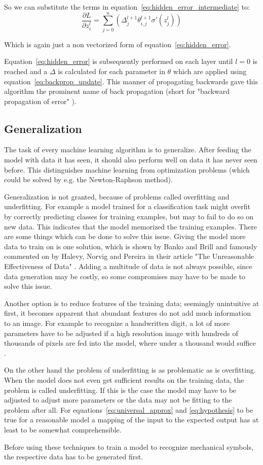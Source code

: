 So we can substitute the terms in equation~\eqref{eq:hidden_error_intermediate} to:
\begin{equation}
    \frac{\partial L}{\partial z^l_i} = \sum_{j=0}^n (\varDelta^{l+1}_j \theta^{l+1}_{i,j} \sigma'(z_j^l))
\end{equation}

Which is again just a non vectorized form of equation~\eqref{eq:hidden_error}.

Equation~\eqref{eq:hidden_error} is subsequently performed on each layer until $l=0$ is reached and a $\varDelta$ is calculated for each parameter in $\theta$ which are applied using equation~\eqref{eq:backprop_update}.
This manner of propagating backwards gave this algorithm the prominent name of back propagation (short for "backward propagation of error" \cite{Rumelhart1986}).

\subsection{Generalization}

The task of every machine learning algorithm is to generalize.
After feeding the model with data it has seen, it should also perform well on data it has never seen before.
This distinguishes machine learning from optimization problems (which could be solved by e.g. the Newton-Raphson method).

Generalization is not granted, because of problems called overfitting and underfitting.
For example a model trained for a classification task might overfit by correctly predicting classes for training examples, but may to fail to do so on new data.
This indicates that the model memorized the training examples.
There are some things which can be done to solve this issue.
Giving the model more data to train on is one solution, which is shown by Banko and Brill \cite{Banko2001} and famously commented on by Halevy, Norvig and Pereira in their article "The Unreasonable Effectiveness of Data" \cite{Halevy2009}.
Adding a multitude of data is not always possible, since data generation may be costly, so some compromises may have to be made to solve this issue.

Another option is to reduce features of the training data; seemingly unintuitive at first, it becomes apparent that abundant features do not add much information to an image. For example to recognize a handwritten digit, a lot of more parameters have to be adjusted if a high resolution image with hundreds of thousands of pixels are fed into the model, where under a thousand would suffice \cite{Nielsen2015}.

On the other hand the problem of underfitting is as problematic as is overfitting.
When the model does not even get sufficient results on the training data, the problem is called underfitting.
If this is the case the model may have to be adjusted to adjust more parameters or the data may not be fitting to the problem after all.
For equations~\eqref{eq:universal_approx} and \eqref{eq:hypothesis} to be true for a reasonable model a mapping of the input to the expected output has at least to be somewhat comprehensible.

Before using these techniques to train a model to recognize mechanical symbols, the respective data has to be generated first.
